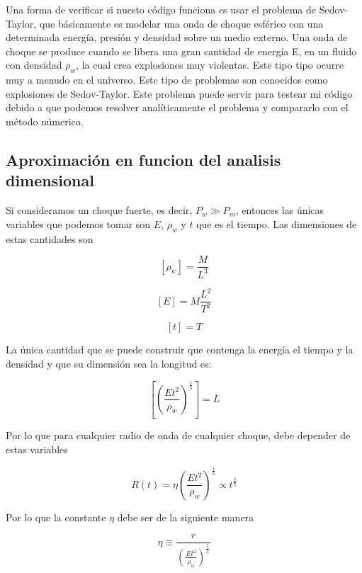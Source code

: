 \documentclass[12pt,a4paper]{book}
\begin{document}
Una forma de verificar si nuesto código funciona es usar el problema de Sedov-Taylor, que básicamente es modelar una onda de choque esférico con una determinada 
energía, presión y densidad sobre un medio externo. 
Una onda de choque se produce cuando se libera una gran cantidad de energía E, en un fluido con densidad $\rho_w$, la cual crea explosiones muy violentas. 
Este tipo tipo ocurre muy a menudo en el universo. Este tipo de problemas son conocidos como explosiones de Sedov-Taylor. Este problema puede servir para testear mi código debido a que podemos resolver analíticamente el problema y compararlo con el método númerico.

\subsection{Aproximación en funcion del analisis dimensional}
Si consideramos un choque fuerte,
es decir, $P_w \gg P_m$,
entonces las únicas variables que podemos tomar son $E$, $\rho_w$ y $t$ que es el tiempo.
Las dimensiones de estas cantidades son 

\begin{equation}
  \left[ \rho_w \right] = \frac{M}{L^3}
\end{equation}

\begin{equation}
  \left[E\right] = M \frac{L^2}{T^2}
\end{equation}

\begin{equation}
  \left[ t\right] = T
\end{equation}

La única cantidad que se puede construir que contenga la energía el tiempo y la densidad y que su dimensión sea
la longitud es:

\begin{equation}
  \left[ \left( \frac{Et^2}{ \rho_w } \right)^{\frac{1}{5}}\right] = L
\end{equation}

Por lo que para cualquier radio de onda de cualquier choque, debe depender de estas variables

\begin{equation}
  R(t) = \eta  \left( \frac{Et^2}{ \rho_w } \right)^{\frac{1}{5}} \varpropto t^{\frac{2}{5}}
\end{equation}

Por lo que la constante $\eta$ debe ser de la siguiente manera

\begin{equation}
  \eta \equiv \frac{r}{\left( \frac{Et^2}{\rho_w} \right)^{\frac{1}{5}}}
\end{equation}
\end{document}
